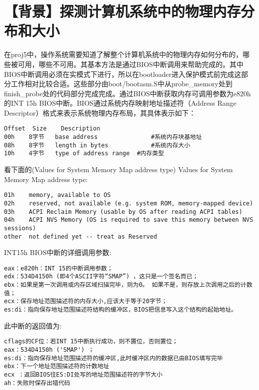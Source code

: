 \section{【背景】探测计算机系统中的物理内存分布和大小}\label{ux80ccux666fux63a2ux6d4bux8ba1ux7b97ux673aux7cfbux7edfux4e2dux7684ux7269ux7406ux5185ux5b58ux5206ux5e03ux548cux5927ux5c0f}

在proj5中，操作系统需要知道了解整个计算机系统中的物理内存如何分布的，哪些被可用，哪些不可用。其基本方法是通过BIOS中断调用来帮助完成的。其中BIOS中断调用必须在实模式下进行，所以在bootloader进入保护模式前完成这部分工作相对比较合适。这些部分由boot/bootasm.S中从probe\_memory处到finish\_probe处的代码部分完成完成。通过BIOS中断获取内存可调用参数为e820h的INT
15h BIOS中断。BIOS通过系统内存映射地址描述符（Address Range
Descriptor）格式来表示系统物理内存布局，其具体表示如下：

\begin{lstlisting}
Offset  Size    Description     
00h    8字节   base address               #系统内存块基地址
08h    8字节   length in bytes            #系统内存大小
10h    4字节   type of address range  #内存类型
\end{lstlisting}

看下面的(Values for System Memory Map address type)  Values for System
Memory Map address type:

\begin{lstlisting}
01h    memory, available to OS
02h    reserved, not available (e.g. system ROM, memory-mapped device)
03h    ACPI Reclaim Memory (usable by OS after reading ACPI tables)
04h    ACPI NVS Memory (OS is required to save this memory between NVS sessions)
other  not defined yet -- treat as Reserved
\end{lstlisting}

INT15h BIOS中断的详细调用参数:

\begin{lstlisting}
eax：e820h：INT 15的中断调用参数；
edx：534D4150h (即4个ASCII字符“SMAP”) ，这只是一个签名而已；
ebx：如果是第一次调用或内存区域扫描完毕，则为0。 如果不是，则存放上次调用之后的计数值；
ecx：保存地址范围描述符的内存大小,应该大于等于20字节；
es:di：指向保存地址范围描述符结构的缓冲区，BIOS把信息写入这个结构的起始地址。
\end{lstlisting}

此中断的返回值为:

\begin{lstlisting}
cflags的CF位：若INT 15中断执行成功，则不置位，否则置位； 
eax：534D4150h ('SMAP') ；
es:di：指向保存地址范围描述符的缓冲区,此时缓冲区内的数据已由BIOS填写完毕 
ebx：下一个地址范围描述符的计数地址 
ecx ：返回BIOS往ES:DI处写的地址范围描述符的字节大小 
ah：失败时保存出错代码
\end{lstlisting}

